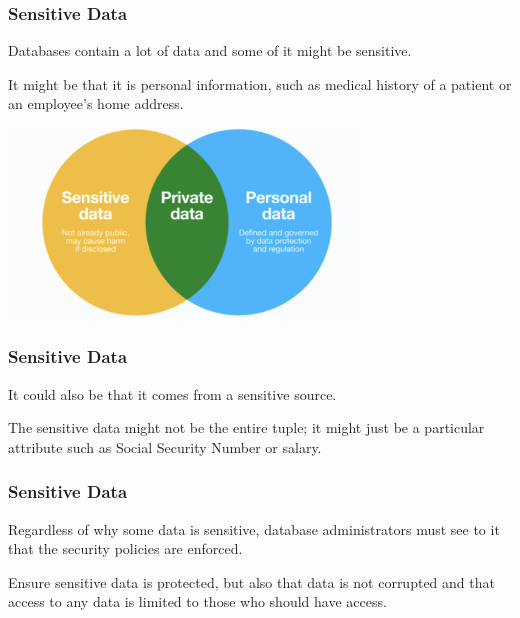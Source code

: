 \begin{frame}
\frametitle{Sensitive Data}

Databases contain a lot of data and some of it might be sensitive. 

It might be that it is personal information, such as medical history of a patient or an employee's home address.

\begin{center}
	\includegraphics[width=0.7\textwidth]{images/private-data.png}
\end{center}

\end{frame}


\begin{frame}
\frametitle{Sensitive Data}


It could also be that it comes from a sensitive source. 

The sensitive data might not be the entire tuple; it might just be a particular attribute  such as Social Security Number or salary.


\end{frame}


\begin{frame}
\frametitle{Sensitive Data}

Regardless of why some data is sensitive, database administrators must see to it that the security policies are enforced. 

Ensure sensitive data is protected, but also that data is not corrupted and that access to any data is limited to those who should have access. 

\end{frame}



